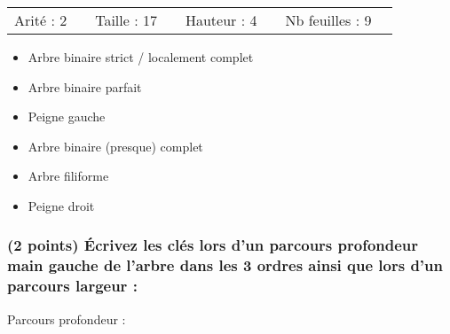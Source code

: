 \documentclass[11pt,a4paper]{article}
\begin{document}
\begin{tabular}{L{2cm}C{1.5cm} L{2cm}C{1.5cm} L{2cm}C{1.5cm} L{2cm}C{1.5cm}}
Arité : 2 & & Taille : 17 & & Hauteur : 4 & & Nb feuilles : 9 & \\
\end{tabular}

\medskip

\begin{table}[ht!]
  \centering
  \begin{minipage}{0.50\textwidth}
    \centering

\begin{itemize}
  \item[\checkmark] Arbre binaire strict / localement complet \phantom{()}
  \item[\CaseCoche] Arbre binaire parfait \phantom{()}
  \item[\CaseCoche] Peigne gauche \phantom{()}
\end{itemize}

  \end{minipage}
  \hfillx
  \begin{minipage}{0.50\textwidth}
    \centering

\begin{itemize}
  \item[\CaseCoche] Arbre binaire (presque) complet \phantom{()}
  \item[\CaseCoche] Arbre filiforme \phantom{()}
  \item[\CaseCoche] Peigne droit \phantom{()}
\end{itemize}

  \end{minipage}
\end{table}



\subsubsection{(2 points) \'Ecrivez les clés lors d'un parcours profondeur main gauche de l'arbre dans les 3 ordres ainsi que lors d'un parcours largeur : }


Parcours profondeur :

\medskip
\end{document}
